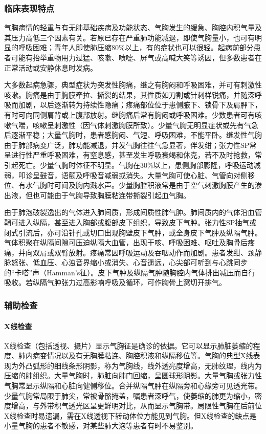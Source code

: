\subsubsection{临床表现特点}

气胸病情的轻重与有无肺基础疾病及功能状态、气胸发生的缓急、胸腔内积气量及其压力高低三个因素有关。若原已存在严重肺功能减退，即使气胸量小，也可有明显的呼吸困难；青年人即使肺压缩80\%以上，有的症状也可以很轻。起病前部分患者可能有抬举重物用力过猛、咳嗽、喷嚏、屏气或高喊大笑等诱因，但多数患者在正常活动或安静休息时发病。

大多数起病急骤，典型症状为突发性胸痛，继之有胸闷和呼吸困难，并可有刺激性咳嗽。胸痛是由于胸膜牵拉、撕裂的结果，其性质如刀割或针刺样锐痛，并随深呼吸而加剧，以后逐渐转为持续性隐痛；疼痛部位位于患侧腋下、锁骨下及肩胛下，有时可向同侧肩背或上腹部放射。继胸痛后常有胸闷或呼吸困难。少数患者可有咳嗽气喘，咳嗽呈刺激性（因气体刺激胸膜所致）。少量气胸无明显症状或先有气急后逐渐平稳；大量气胸时，患者感胸闷、气短、呼吸困难，不能平卧。继发性气胸由于肺部病变广泛，肺功能减退，并发气胸往往气急显著，伴发绀；张力性SP常呈进行性严重呼吸困难，有窒息感，甚至发生呼吸衰竭和休克，若不及时抢救，常引起死亡。少量气胸时体征不明显。气胸在30\%以上，患侧胸部膨隆，呼吸运动减弱，叩诊呈鼓音，语颤及呼吸音减弱或消失。大量气胸可使心脏、气管向对侧移位、有水气胸时可闻及胸内溅水声。少量胸腔积液常是由于空气刺激胸膜产生的渗出液，但也可能由于气胸导致胸膜粘连带撕裂引起血气胸。

由于肺泡破裂逸出的气体进入肺间质，形成间质性肺气肿。肺间质内的气体沿血管鞘可进入纵隔，甚至进入胸部或腹部皮下组织，导致皮下气肿。张力性SP抽气或闭式引流后，亦可沿针孔或切口出现胸壁皮下气肿，或全身皮下气肿及纵隔气肿。气体积聚在纵隔间隙可压迫纵隔大血管，出现干咳、呼吸困难、呕吐及胸骨后疼痛，并向双肩或双臂放射。疼痛常因呼吸运动及吞咽动作而加剧。患者发绀、颈静脉怒张、低血压、心浊音界缩小或消失、心音遥远，心尖部可听到与心跳同步的“卡嗒”声（Hamman's征）。皮下气肿及纵隔气肿随胸腔内气体排出减压而自行吸收。若纵隔气肿张力过高影响呼吸及循环，可作胸骨上窝切开排气。

\subsubsection{辅助检查}

\paragraph{X线检查}

X线检查（包括透视、摄片）显示气胸征是确诊的依据。它可以显示肺脏萎缩的程度、肺内病变情况以及有无胸膜粘连、胸腔积液和纵隔移位等。气胸的典型X线表现为外凸弧形的细线条形阴影，称为气胸线，线外透亮度增高，无肺纹理，线内为压缩的肺组织。大量气胸时，肺脏向肺门回缩，呈圆球形阴影。大量气胸或张力性气胸常显示纵隔和心脏向健侧移位。合并纵隔气肿在纵隔旁和心缘旁可见透光带。少量气胸常局限于肺尖，常被骨骼掩盖，嘱患者深呼气，使萎缩的肺更为缩小，密度增高，与外带积气透光区呈更鲜明对比，从而显示气胸带。局限性气胸在后前位X线检查时易遗漏，需在X线透视下转动体位方能见到气胸。但X线检查的缺点是小量气胸的患者不敏感，对某些肺大泡等患者有时不易鉴别。

